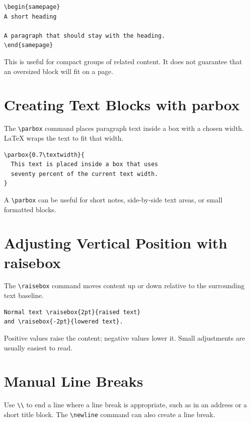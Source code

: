 \documentclass[12pt,a4paper]{article}
\begin{document}
\begin{verbatim}
\begin{samepage}
A short heading

A paragraph that should stay with the heading.
\end{samepage}
\end{verbatim}

This is useful for compact groups of related content. It does not guarantee
that an oversized block will fit on a page.

\section{Creating Text Blocks with parbox}

The \verb|\parbox| command places paragraph text inside a box with a chosen
width. LaTeX wraps the text to fit that width.

\begin{verbatim}
\parbox{0.7\textwidth}{
  This text is placed inside a box that uses
  seventy percent of the current text width.
}
\end{verbatim}

A \verb|\parbox| can be useful for short notes, side-by-side text areas, or
small formatted blocks.

\section{Adjusting Vertical Position with raisebox}

The \verb|\raisebox| command moves content up or down relative to the
surrounding text baseline.

\begin{verbatim}
Normal text \raisebox{2pt}{raised text}
and \raisebox{-2pt}{lowered text}.
\end{verbatim}

Positive values raise the content; negative values lower it. Small adjustments
are usually easiest to read.

\section{Manual Line Breaks}

Use \verb|\\| to end a line where a line break is appropriate, such as in an
address or a short title block. The \verb|\newline| command can also create a
line break.
\end{document}
